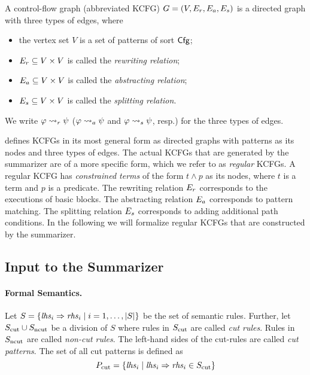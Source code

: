 \documentclass{article}
\begin{document}
\begin{definition}
\label{def:KCFG}
A \K control-flow graph (abbreviated KCFG) 
$G = (V, E_r, E_a, E_s)$ is a directed graph
with three types of edges, where
\begin{itemize}
\item the vertex set $V$ is a set of patterns of sort $\mathsf{Cfg}$;
\item $E_r \subseteq V \times V$ is called the \emph{rewriting relation};
\item $E_a \subseteq V \times V$ is called the \emph{abstracting relation};
\item $E_s \subseteq V \times V$ is called the \emph{splitting relation}. 
\end{itemize}
We write $\varphi \rightsquigarrow_r \psi$ 
($\varphi \rightsquigarrow_a \psi$ and $\varphi \rightsquigarrow_s \psi$, resp.)
for the three types of edges.
\end{definition}

 defines KCFGs in its most general form
as directed graphs with patterns as its nodes and
three types of edges.
The actual KCFGs that are generated by the \K summarizer
are of a more specific form, which we refer to as \emph{regular} KCFGs. 
A regular KCFG has \emph{constrained terms} 
of the form $t \land p$ as its nodes,
where $t$ is a term and $p$ is a predicate. 
The rewriting relation $E_r$ corresponds to the executions of basic
blocks.
The abstracting relation $E_a$ corresponds to pattern matching.
The splitting relation $E_s$ corresponds to adding
additional path conditions.
In the following we will formalize regular KCFGs that are constructed by the \K summarizer.

\subsection{Input to the \K Summarizer}
\label{sec:k-summarizer-input}

\paragraph{Formal Semantics.}

Let $S = \{ \mathit{lhs}_i \Rightarrow \mathit{rhs}_i \mid i = 1, \dots, \left|S\right| \} $ be the set of semantic rules. 
Further, let $S_\text{cut} \cup S_\text{ncut}$ be a division of $S$ where
rules in $S_\text{cut}$ are called \emph{cut rules}.
Rules in $S_\text{ncut}$ are called \emph{non-cut rules}. 
The left-hand sides of the cut-rules are called \emph{cut patterns}.
The set of all cut patterns is defined as
\[P_\text{cut} = \{\mathit{lhs}_i \mid \mathit{lhs}_i \Rightarrow \mathit{rhs}_i \in S_\text{cut}\}\]
\end{document}
